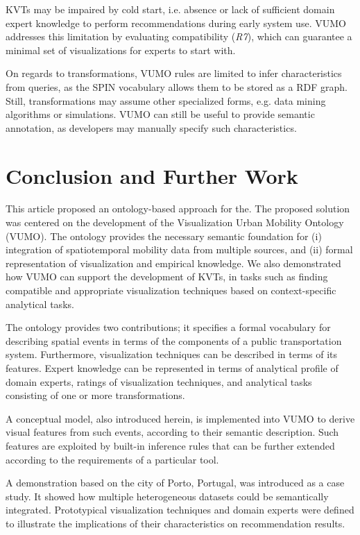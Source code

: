 \documentclass[]{interact}
\theoremstyle{plain}%
\theoremstyle{definition}
\theoremstyle{remark}
\theoremstyle{definition}
\begin{document}
KVTs may be impaired by cold start, i.e. absence or lack of sufficient domain expert knowledge to perform recommendations during early system use. VUMO addresses this limitation by evaluating compatibility (\textit{R7}), which can guarantee a minimal set of visualizations for experts to start with.

On regards to transformations, VUMO rules are limited to infer characteristics from queries, as the SPIN vocabulary allows them to be stored as a RDF graph. Still, transformations may assume other specialized forms, e.g. data mining algorithms or simulations. VUMO can still be useful to provide semantic annotation, as developers may manually specify such characteristics.


\section{Conclusion and Further Work}
\label{sec:conclusions}

This article proposed an ontology-based approach for the. The proposed solution was centered on the development of the Visualization Urban Mobility Ontology (VUMO). The ontology provides the necessary semantic foundation for (i) integration of spatiotemporal mobility data from multiple sources, and (ii) formal representation of visualization and empirical knowledge. We also demonstrated how VUMO can support the development of KVTs, in tasks such as finding compatible and appropriate visualization techniques based on context-specific analytical tasks.

The ontology provides two contributions; it specifies a formal vocabulary for describing spatial events in terms of the components of a public transportation system. Furthermore, visualization techniques can be described in terms of its features. Expert knowledge can be represented in terms of analytical profile of domain experts, ratings of visualization techniques, and analytical tasks consisting of one or more transformations.

A conceptual model, also introduced herein, is implemented into VUMO to derive visual features from such events, according to their semantic description. Such features are exploited by built-in inference rules that can be further extended according to the requirements of a particular tool.

A demonstration based on the city of Porto, Portugal, was introduced as a case study. It showed how multiple heterogeneous datasets could be semantically integrated. Prototypical visualization techniques and domain experts were defined to illustrate the implications of their characteristics on recommendation results.
\end{document}
